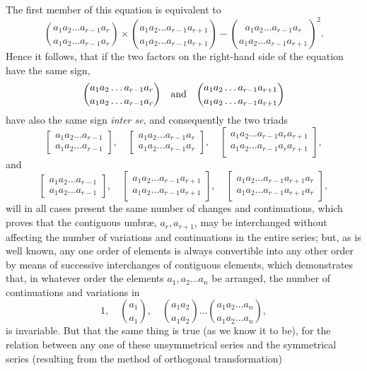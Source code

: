 \documentclass[11pt]{article}
\newcommand{\sourcepage}[1]{\marginpar{\scriptsize p.~#1}}
\begin{document}
{{\sourcepage{381}
The first member of this equation is equivalent to
\[
\binom{a_1a_2\ldots a_{r-1}a_r}{a_1a_2\ldots a_{r-1}a_r}
\times
\binom{a_1a_2\ldots a_{r-1}a_{r+1}}{a_1a_2\ldots a_{r-1}a_{r+1}}
-
\binom{a_1a_2\ldots a_{r-1}a_r}{a_1a_2\ldots a_{r-1}a_{r+1}}^2.
\]
Hence it follows, that if the two factors on the right-hand side of the equation have the same sign,
\[
\binom{a_1a_2\ldots a_{r-1}a_r}{a_1a_2\ldots a_{r-1}a_r}
\quad\hbox{and}\quad
\binom{a_1a_2\ldots a_{r-1}a_{r+1}}{a_1a_2\ldots a_{r-1}a_{r+1}}
\]
have also the same sign \emph{inter se}, and consequently the two triads
\[
\left[\begin{array}{c}a_1a_2\ldots a_{r-1}\\ a_1a_2\ldots a_{r-1}\end{array}\right],\quad
\left[\begin{array}{c}a_1a_2\ldots a_{r-1}a_r\\ a_1a_2\ldots a_{r-1}a_r\end{array}\right],\quad
\left[\begin{array}{c}a_1a_2\ldots a_{r-1}a_ra_{r+1}\\ a_1a_2\ldots a_{r-1}a_ra_{r+1}\end{array}\right],
\]
and
\[
\left[\begin{array}{c}a_1a_2\ldots a_{r-1}\\ a_1a_2\ldots a_{r-1}\end{array}\right],\quad
\left[\begin{array}{c}a_1a_2\ldots a_{r-1}a_{r+1}\\ a_1a_2\ldots a_{r-1}a_{r+1}\end{array}\right],\quad
\left[\begin{array}{c}a_1a_2\ldots a_{r-1}a_{r+1}a_r\\ a_1a_2\ldots a_{r-1}a_{r+1}a_r\end{array}\right],
\]
will in all cases present the same number of changes and continuations, which proves that the contiguous umbræ, $a_r,a_{r+1}$, may be interchanged without affecting the number of variations and continuations in the entire series; but, as is well known, any one order of elements is always convertible into any other order by means of successive interchanges of contiguous elements, which demonstrates that, in whatever order the elements $a_1,a_2\ldots a_n$ be arranged, the number of continuations and variations in
\[
1,\quad \binom{a_1}{a_1},\quad
\binom{a_1a_2}{a_1a_2}\ldots
\binom{a_1a_2\ldots a_n}{a_1a_2\ldots a_n},
\]
is invariable. But that the same thing is true (as we know it to be), for the relation between any one of these unsymmetrical series and the symmetrical series (resulting from the method of orthogonal transformation)
}}
\end{document}
